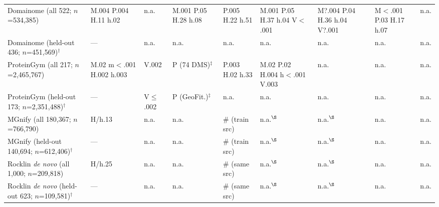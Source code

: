 \begin{table}[H]
{\begin{tabular}{@{}lllllllll}
        \midrule
        Domainome (all 522; $n$=534,385) & M.004 P.004 H.11 h.02 & n.a. & M.001 P.05 H.28 h.08 & P.005 H.22 h.51 & M.001 P.05 H.37 h.04 V$<$.001 & M?.004 P.04 H.36 h.04 V?.001 & M$<$.001 P.03 H.17 h.07 & n.a. \\
        Domainome (held-out 436; $n$=451,569)$^\dagger$ & --- & n.a. & n.a. & n.a. & n.a. & n.a. & n.a. & n.a. \\
        ProteinGym (all 217; $n$=2,465,767) & M.02 m$<$.001 H.002 h.003 & V.002 & P (74 DMS)$^\ddagger$ & P.003 H.02 h.33 & M.02 P.02 H.004 h$<$.001 V.003 & n.a. & n.a. & n.a. \\
        ProteinGym (held-out 173; $n$=2,351,488)$^\dagger$ & --- & V$\le$.002 & P (GeoFit.)$^\ddagger$ & n.a. & n.a. & n.a. & n.a. & n.a. \\
        MGnify (all 180,367; $n$=766,790) & H/h.13 & n.a. & n.a. & \# (train src) & n.a.$^\S$ & n.a.$^\S$ & n.a. & n.a. \\
        MGnify (held-out 140,694; $n$=612,406)$^\dagger$ & --- & n.a. & n.a. & \# (train src) & n.a.$^\S$ & n.a.$^\S$ & n.a. & n.a. \\
        Rocklin \textit{de novo} (all 1,000; $n$=209,818) & H/h.25 & n.a. & n.a. & \# (same src) & n.a.$^\S$ & n.a.$^\S$ & n.a. & n.a. \\
        Rocklin \textit{de novo} (held-out 623; $n$=109,581)$^\dagger$ & --- & n.a. & n.a. & \# (same src) & n.a.$^\S$ & n.a.$^\S$ & n.a. & n.a. \\
    \bottomrule
    \end{tabular}
    }
    \par\bigskip
\end{table}


